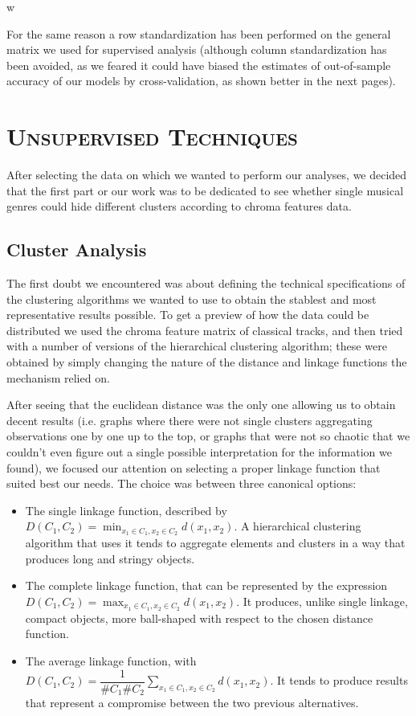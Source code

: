 w\documentclass[11pt, oneside]{article}
\begin{document}
For the same reason a row standardization has been performed on the general matrix we used for supervised analysis (although column standardization has been avoided, as we feared it could have biased the estimates of out-of-sample accuracy of our models by cross-validation, as shown better in the next pages).
\newpage
\section[Unsupervised Techniques]{\textsc{Unsupervised Techniques}}
After selecting the data on which we wanted to perform our analyses, we decided that the first part or our work was to be dedicated to see whether single musical genres could hide different clusters according to chroma features data.

\subsection{Cluster Analysis}
The first doubt we encountered was about defining the technical specifications of the clustering algorithms we wanted to use to obtain the stablest and most representative results possible. To get a preview of how the data could be distributed we used the chroma feature matrix of classical tracks, and then tried with a number of versions of the hierarchical clustering algorithm; these were obtained by simply changing the nature of the distance and linkage functions the mechanism relied on.

After seeing that the euclidean distance was the only one allowing us to obtain decent results (i.e. graphs where there were not single clusters aggregating observations one by one up to the top, or graphs that were not so chaotic that we couldn't even figure out a single possible interpretation for the information we found), we focused our attention on selecting a proper linkage function that suited best our needs. The choice was between three canonical options:
\begin{itemize}
    \item The single linkage function, described by $D\left(C_1, C_2\right)= \min_{x_1\in C_1, x_2\in C_2}d\left(x_1, x_2\right)$. A hierarchical clustering algorithm that uses it tends to aggregate elements and clusters in a way that produces long and stringy objects.
    \item The complete linkage function, that can be represented by the expression $D\left(C_1, C_2\right)= \max_{x_1\in C_1, x_2\in C_2}d\left(x_1, x_2\right)$. It produces, unlike single linkage, compact objects, more ball-shaped with respect to the chosen distance function.
    \item The average linkage function, with $D\left(C_1, C_2\right)= \dfrac{1}{\#C_1\#C_2} \sum_{x_1\in C_1, x_2\in C_2}d\left(x_1, x_2\right)$. It tends to produce results that represent a compromise between the two previous alternatives.
\end{itemize}
\end{document}
